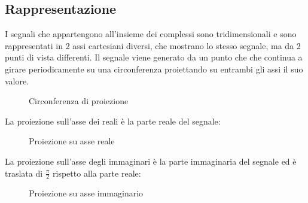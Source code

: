 \documentclass[a4paper]{article}
\begin{document}
\subsection{Rappresentazione}
I segnali che appartengono all'insieme dei complessi sono tridimensionali e sono
rappresentati in 2 assi cartesiani diversi, che mostrano lo stesso segnale, ma
da 2 punti di vista differenti. Il segnale viene generato da un punto che  
che continua a girare periodicamente su una circonferenza proiettando su entrambi
gli assi il suo valore.
\begin{figure}[H]
  \centering
  \caption{Circonferenza di proiezione}
  \label{fig:fasore}
\end{figure}

La proiezione sull'asse dei reali è la parte reale del segnale:
\begin{figure}[H]
  \centering
  \caption{Proiezione su asse reale}
\end{figure}

La proiezione sull'asse degli immaginari è la parte immaginaria del segnale ed è
traslata di \( \frac{\pi}{2} \) rispetto alla parte reale:
\begin{figure}[H]
  \centering
  \caption{Proiezione su asse immaginario}
\end{figure}
\end{document}
